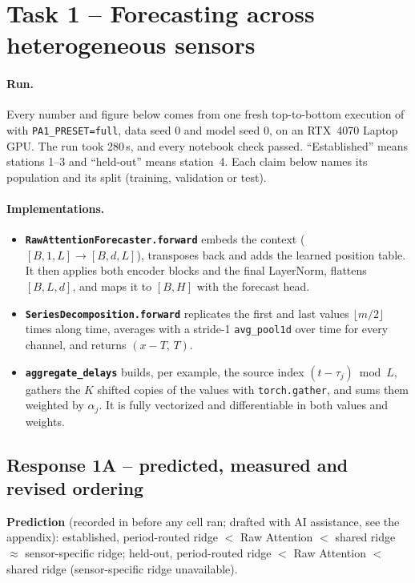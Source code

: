 \section*{Task 1 -- Forecasting across heterogeneous sensors}

\paragraph{Run.} Every number and figure below comes from one fresh top-to-bottom execution of
 with \texttt{PA1\_PRESET=full}, data seed 0 and model seed 0, on an RTX~4070 Laptop GPU. The run took 280\,s, and every notebook check passed. ``Established'' means stations 1--3 and ``held-out'' means station~4. Each claim below names its population and its split (training, validation or test).

\paragraph{Implementations.}
\begin{itemize}
  \item \textbf{\texttt{RawAttentionForecaster.forward}} embeds the context ($[B,1,L]\!\to\![B,d,L]$), transposes back and adds the learned position table. It then applies both encoder blocks and the final LayerNorm, flattens $[B,L,d]$, and maps it to $[B,H]$ with the forecast head.
  \item \textbf{\texttt{SeriesDecomposition.forward}} replicates the first and last values $\lfloor m/2\rfloor$ times along time, averages with a stride-1 \texttt{avg\_pool1d} over time for every channel, and returns $(x-T,\,T)$.
  \item \textbf{\texttt{aggregate\_delays}} builds, per example, the source index $(t-\tau_j)\bmod L$, gathers the $K$ shifted copies of the values with \texttt{torch.gather}, and sums them weighted by $\alpha_j$. It is fully vectorized and differentiable in both values and weights.
\end{itemize}

\subsection*{Response 1A -- predicted, measured and revised ordering}

\textbf{Prediction} (recorded in  before any cell ran; drafted with AI assistance, see the appendix):
established, period-routed ridge $<$ Raw Attention $<$ shared ridge $\approx$ sensor-specific ridge;
held-out, period-routed ridge $<$ Raw Attention $<$ shared ridge (sensor-specific ridge unavailable).

